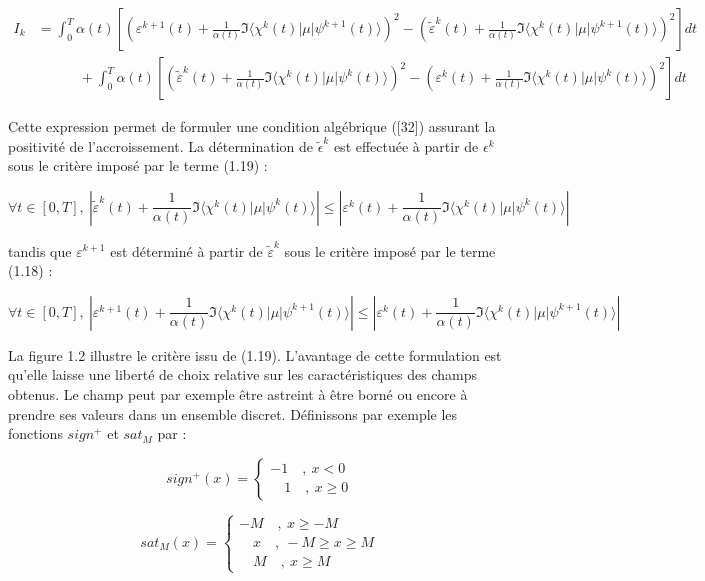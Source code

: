 \begin{align}
I_k & = \int_0^T \alpha(t)\left[ \left(\varepsilon^{k+1}(t) + \frac{1}{\alpha(t)} \Im\langle \chi^k(t)|\mu|\psi^{k+1}(t)\rangle \right)^2 - \left(\tilde{\varepsilon}^k(t) + \frac{1}{\alpha(t)} \Im\langle \chi^k(t)|\mu|\psi^{k+1}(t)\rangle \right)^2 \right] dt \\
& \quad \quad \quad + \int_0^T \alpha(t)\left[ \left(\tilde{\varepsilon}^k(t) + \frac{1}{\alpha(t)} \Im\langle \chi^k(t)|\mu|\psi^k(t)\rangle \right)^2 - \left(\varepsilon^k(t) + \frac{1}{\alpha(t)} \Im\langle \chi^k(t)|\mu|\psi^k(t)\rangle
 \right)^2 \right] dt
\end{align}

Cette expression permet de formuler une condition algébrique ([32]) assurant la positivité de l'accroissement. La détermination de $\tilde{\epsilon}^k$ est effectuée à partir de $ \epsilon^k$ sous le critère imposé par le terme (1.19) :

$$\forall t \in [0,T],\ \left|\tilde{\varepsilon}^k(t) + \frac{1}{\alpha(t)} \Im\langle \chi^k(t)|\mu|\psi^k(t)\rangle\right|\leq \left|\varepsilon^k(t) + \frac{1}{\alpha(t)} \Im\langle \chi^k(t)|\mu|\psi^k(t)\rangle\right| $$

tandis que $\varepsilon^{k+1}$ est déterminé à partir de $\tilde{\varepsilon}^k$ sous le critère imposé par le terme (1.18) :

$$\forall t \in [0,T],\ \left|\varepsilon^{k+1}(t) + \frac{1}{\alpha(t)} \Im\langle \chi^k(t)|\mu|\psi^{k+1}(t)\rangle\right|\leq \left|\varepsilon^k(t) + \frac{1}{\alpha(t)} \Im\langle \chi^k(t)|\mu|\psi^{k+1}(t)\rangle\right| $$

La figure 1.2 illustre le critère issu de (1.19). L'avantage de cette formulation est qu'elle laisse une liberté de choix relative sur les caractéristiques des champs obtenus. Le champ peut par exemple être astreint à être borné ou encore à prendre ses valeurs dans un ensemble discret. Définissons par exemple les fonctions $sign^+$ et $sat_M$ par :

\begin{equation}
sign^+(x) = \begin{cases}
-1 \quad,\ x< 0\\
\quad 1 \quad,\ x \geq 0
\end{cases}
\end{equation}

\begin{equation}
sat_M(x) = \begin{cases}
-M \quad,\ x\geq -M\\
\quad x\quad,\ -M\geq x \geq M\\
\quad M \quad,\ x\geq M 
\end{cases}
\end{equation}

